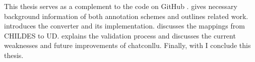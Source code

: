 This thesis serves as a complement to the code on GitHub .  gives necessary background information of both annotation schemes and outlines related work.  introduces the converter and its implementation.  discusses the mappings from CHILDES to UD.  explains the validation process and discusses the current weaknesses and future improvements of chatconllu. Finally, with  I conclude this thesis.






